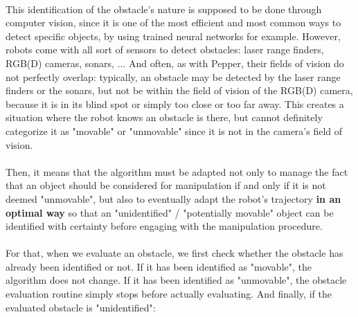 


\paragraph{} This identification of the obstacle's nature is supposed to be done through computer vision, since it is one of the most efficient and most common ways to detect specific objects, by using trained neural networks for example. However, robots come with all sort of sensors to detect obstacles: laser range finders, RGB(D) cameras, sonars, ... And often, as with Pepper, their fields of vision do not perfectly overlap: typically, an obstacle may be detected by the laser range finders or the sonars, but not be within the field of vision of the RGB(D) camera, because it is in its blind spot or simply too close or too far away. This creates a situation where the robot knows an obstacle is there, but cannot definitely categorize it as "movable" or "unmovable" since it is not in the camera's field of vision.

\paragraph{} Then, it means that the algorithm must be adapted not only to manage the fact that an object should be considered for manipulation if and only if it is not deemed "unmovable", but also to eventually adapt the robot's trajectory \textbf{in an optimal way} so that an "unidentified" / "potentially movable" object can be identified with certainty before engaging with the manipulation procedure.

\paragraph{} For that, when we evaluate an obstacle, we first check whether the obstacle has already been identified or not. If it has been identified as "movable", the algorithm does not change. If it has been identified as "unmovable", the obstacle evaluation routine simply stops before actually evaluating. And finally, if the evaluated obstacle is "unidentified":


